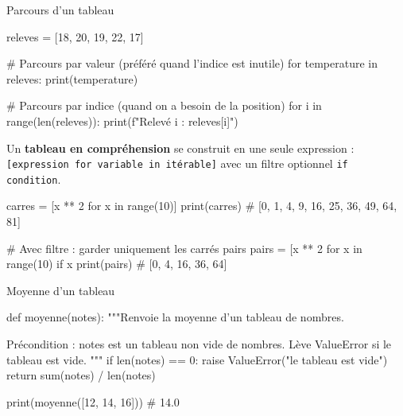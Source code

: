 \begin{codereference}{Parcours d'un tableau}
\begin{python}
releves = [18, 20, 19, 22, 17]

# Parcours par valeur (préféré quand l'indice est inutile)
for temperature in releves:
    print(temperature)

# Parcours par indice (quand on a besoin de la position)
for i in range(len(releves)):
    print(f"Relevé {i} : {releves[i]}")
\end{python}
\end{codereference}


\begin{nxdef}[D6]
  Un \textbf{tableau en compréhension} se construit en une seule expression :
  \lstinline{[expression for variable in itérable]} avec un filtre optionnel
  \lstinline{if condition}.
\end{nxdef}


\begin{python}
carres = [x ** 2 for x in range(10)]
print(carres)  # [0, 1, 4, 9, 16, 25, 36, 49, 64, 81]

# Avec filtre : garder uniquement les carrés pairs
pairs = [x ** 2 for x in range(10) if x %
print(pairs)   # [0, 4, 16, 36, 64]
\end{python}



\begin{codereference}{Moyenne d'un tableau}
\begin{python}
def moyenne(notes):
    """Renvoie la moyenne d'un tableau de nombres.

    Précondition : notes est un tableau non vide de nombres.
    Lève ValueError si le tableau est vide.
    """
    if len(notes) == 0:
        raise ValueError("le tableau est vide")
    return sum(notes) / len(notes)

print(moyenne([12, 14, 16]))  # 14.0
\end{python}
\end{codereference}

